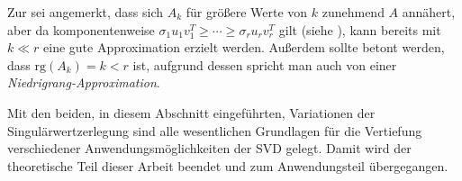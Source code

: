 Zur  sei angemerkt, dass sich \(A_k\) für größere Werte von \(k\) zunehmend \(A\) annähert, aber da komponentenweise \(\sigma_1 u_1 v^{T}_1 \geq \cdots \geq \sigma_r u_r v^{T}_r\) gilt (siehe ), kann bereits mit \(k \ll r\) eine gute Approximation erzielt werden. 
Außerdem sollte betont werden, dass \(\text{rg}(A_k)=k < r\) ist, aufgrund dessen spricht man auch von einer \textit{Niedrigrang-Approximation}.

Mit den beiden, in diesem Abschnitt eingeführten, Variationen der Singulärwertzerlegung sind alle wesentlichen Grundlagen für die Vertiefung verschiedener Anwendungsmöglichkeiten der SVD gelegt.
Damit wird der theoretische Teil dieser Arbeit beendet und zum Anwendungsteil übergegangen.
